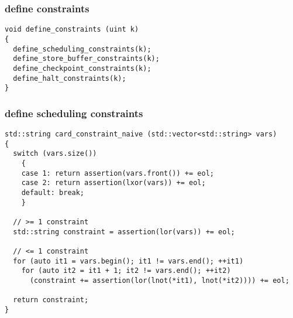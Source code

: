 \subsubsection{define constraints}

\begin{lstlisting}[style=c++]
void define_constraints (uint k)
{
  define_scheduling_constraints(k);
  define_store_buffer_constraints(k);
  define_checkpoint_constraints(k);
  define_halt_constraints(k);
}
\end{lstlisting}

\subsubsection{define scheduling constraints}

\begin{lstlisting}[style=c++]
std::string card_constraint_naive (std::vector<std::string> vars)
{
  switch (vars.size())
    {
    case 1: return assertion(vars.front()) += eol;
    case 2: return assertion(lxor(vars)) += eol;
    default: break;
    }

  // >= 1 constraint
  std::string constraint = assertion(lor(vars)) += eol;

  // <= 1 constraint
  for (auto it1 = vars.begin(); it1 != vars.end(); ++it1)
    for (auto it2 = it1 + 1; it2 != vars.end(); ++it2)
      (constraint += assertion(lor(lnot(*it1), lnot(*it2)))) += eol;

  return constraint;
}
\end{lstlisting}

